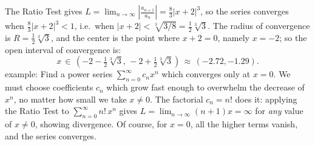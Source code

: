 \documentclass[11pt]{article}
\begin{document}
The Ratio Test gives $L =\lim_{n\to\infty}|\frac{a_{n+1}}{a_n}|
= \frac83 |x{+}2|^3$, so the series converges when $\frac83 |x{+}2|^3< 1$,
i.e.~when $|x{+}2|<\sqrt[3]{3/8}=\frac12\sqrt[3]3$. 
The radius of convergence is $R=\frac12\sqrt[3]3$, 
and the center is the point where $x{+}2=0$, 
namely $x=-2$; so the open interval of convergence is: 
$$
x\,\in\,(-2-\tfrac12\sqrt[3]3,\,-2+\tfrac12\sqrt[3]3) \,\approx\, 
(-2.72,-1.29).
$$
{\sc example:} Find a power series $\sum_{n=0}^\infty c_n x^n$ which converges only at $x=0$.
We must choose coefficients $c_n$ which grow fast enough to overwhelm the decrease of 
$x^n$, no matter how small we take $x\neq 0$. The factorial $c_n=n!$ does it:
applying the Ratio Test to $\sum_{n=0}^\infty n!\,x^n$ gives
$L=\lim_{n\to \infty} (n{+}1)x=\infty$ for {\it any} value of $x\neq 0$,
showing divergence. Of course, for $x=0$, all the higher terms vanish, and the series converges.
\end{document}
